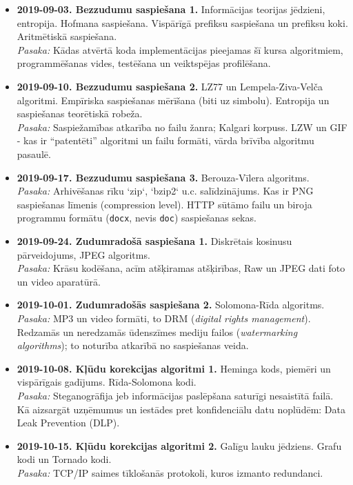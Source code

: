 \documentclass[11pt]{article}
\begin{document}
\begin{itemize}
\item {\bf 2019-09-03. Bezzudumu saspiešana \textendash{} 1.} 
Informācijas teorijas jēdzieni, entropija. Hofmana saspiešana. 
Vispārīgā prefiksu saspiešana un prefiksu koki. Aritmētiskā saspiešana.\\
{\em Pasaka:} 
Kādas atvērtā koda implementācijas pieejamas šī kursa algoritmiem, programmēšanas vides,
testēšana un veiktspējas profilēšana.
\item {\bf 2019-09-10. Bezzudumu saspiešana \textendash{} 2.} 
LZ77 un Lempela-Ziva-Velča algoritmi. 
Empīriska saspiešanas mērīšana (biti uz simbolu). Entropija un saspiešanas teorētiskā robeža. \\
{\em Pasaka:} 
Saspiežamības atkarība no failu žanra; Kalgari korpuss.
LZW un GIF - kas ir “patentēti” algoritmi un failu formāti, vārda brīvība algoritmu pasaulē.
\item {\bf 2019-09-17. Bezzudumu saspiešana \textendash{} 3.} 
Berouza-Vīlera algoritms.\\
{\em Pasaka:} 
Arhivēšanas rīku `zip`, `bzip2` u.c. salīdzinājums. Kas ir PNG saspiešanas līmenis (compression level). 
HTTP sūtāmo failu un biroja programmu formātu ({\tt docx}, nevis {\tt doc}) saspiešanas sekas.
\item {\bf 2019-09-24. Zudumradošā saspiešana \textendash{} 1.} Diskrētais kosinusu pārveidojums, JPEG algoritms.\\
{\em Pasaka:} 
Krāsu kodēšana, acīm atšķiramas atšķirības, Raw un JPEG dati foto un video aparatūrā.
\item {\bf 2019-10-01. Zudumradošās saspiešana \textendash{} 2.} Solomona-Rīda algoritms.\\
{\em Pasaka:} 
MP3 un video formāti, to DRM ({\em digital rights management}). Redzamās un neredzamās 
ūdenszīmes mediju failos ({\em watermarking algorithms}); to noturība atkarībā no saspiešanas veida.
\item {\bf 2019-10-08. Kļūdu korekcijas algoritmi \textendash{} 1.} Heminga kods, piemēri un vispārīgais gadījums. 
Rīda-Solomona kodi.\\
{\em Pasaka:} 
Steganogrāfija jeb informācijas paslēpšana saturīgi nesaistītā failā. 
Kā aizsargāt uzņēmumus un iestādes pret konfidenciālu datu noplūdēm: Data Leak Prevention (DLP).
\item {\bf 2019-10-15. Kļūdu korekcijas algoritmi \textendash{} 2.} Galīgu lauku jēdziens. 
Grafu kodi un Tornado kodi.\\
{\em Pasaka:} TCP/IP saimes tīklošanās protokoli, kuros izmanto redundanci.

\end{itemize}
\end{document}
